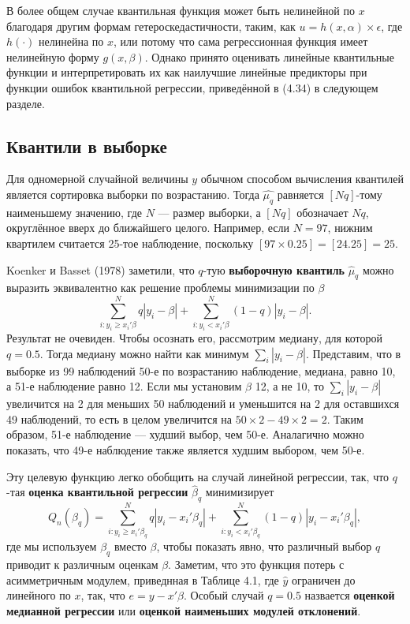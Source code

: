 В более общем случае квантильная функция может быть нелинейной по $x$ благодаря другим формам гетероскедастичности, таким, как $u=h(x,\alpha) \times \epsilon$, где $h(\cdot)$ нелинейна по $x$, или потому что сама регрессионная функция имеет нелинейную форму $g(x, \beta)$. Однако принято оценивать линейные квантильные функции и интерпретировать их как наилучшие линейные предикторы при функции ошибок квантильной регрессии, приведённой в (4.34) в следующем разделе.  

\subsection{Квантили в выборке}

Для одномерной случайной величины $y$ обычном способом вычисления квантилей является сортировка выборки по возрастанию. Тогда $\hat{\mu_q}$ равняется $[Nq]$-тому наименьшему значению, где $N$ --- размер выборки, а  $[Nq]$ обозначает $Nq$, округлённое вверх до ближайшего целого. Например, если $N=97$, нижним квартилем считается 25-тое наблюдение, поскольку $[97 \times 0.25] =[24.25] = 25$.

Koenker и Basset (1978) заметили, что $q$-тую \textbf{выборочную квантиль} $\hat{\mu}_q$ можно выразить эквивалентно как решение проблемы минимизации по $\beta$
$$\sum_{i:y_i \geq x_i'\beta}^{N} q|y_i-\beta| + \sum_{i:y_i < x_i'\beta}^{N} (1-q)|y_i-\beta|. $$
Результат не очевиден. Чтобы осознать его, рассмотрим медиану, для которой $q=0.5$. Тогда медиану можно найти как минимум $\sum_i |y_i -\beta|$. Представим, что в выборке из 99 наблюдений 50-е по возрастанию наблюдение, медиана, равно 10, а 51-е наблюдение равно 12. Если мы установим $\beta$ 12, а не 10, то $\sum_i |y_i -\beta|$ увеличится на 2 для меньших 50 наблюдений и уменьшится на 2 для оставшихся 49 наблюдений, то есть в целом увеличится на $50 \times 2 - 49 \times 2 = 2$. Таким образом, 51-е наблюдение --- худший выбор, чем 50-е. Аналагично можно показать, что 49-е наблюдение также является худшим выбором, чем 50-е.

Эту целевую функцию легко обобщить на случай линейной регрессии, так, что $q$-тая \textbf{оценка квантильной регрессии} $\hat{\beta}_q$ минимизирует
\begin{equation}
Q_n(\beta_q) = \sum_{i:y_i \geq x_i'\beta_q}^{N} q|y_i-x_i'\beta_q| + \sum_{i:y_i < x_i'\beta_q}^{N} (1-q)|y_i-x_i'\beta_q|,
\end{equation}
где мы используем $\beta_q$ вместо $\beta$, чтобы показать явно, что различный выбор $q$ приводит к различным оценкам $\beta$. Заметим, что это функция потерь с асимметричным модулем, приведнная в Таблице 4.1, где $\hat{y}$ ограничен до линейного по $x$, так, что $e = y -x'\beta$.  Особый случай $q=0.5$ назвается \textbf{оценкой медианной регрессии} или \textbf{оценкой наименьших модулей отклонений}. 

